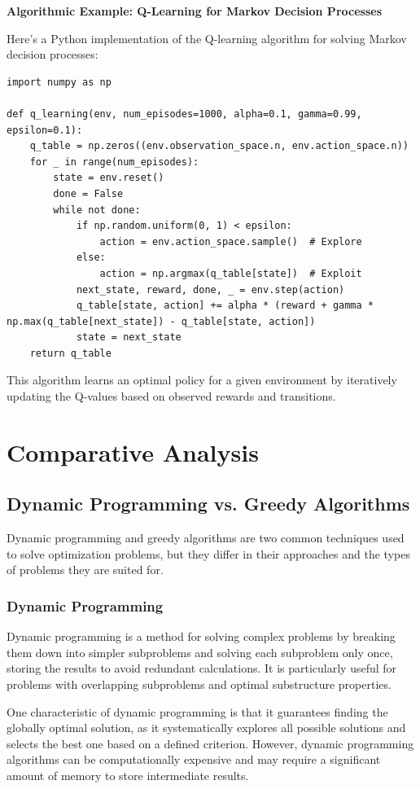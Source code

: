 \documentclass[12pt]{book} %
\begin{document}
\textbf{Algorithmic Example: Q-Learning for Markov Decision Processes}

Here's a Python implementation of the Q-learning algorithm for solving Markov decision processes:
\FloatBarrier
\begin{lstlisting}
import numpy as np

def q_learning(env, num_episodes=1000, alpha=0.1, gamma=0.99, epsilon=0.1):
    q_table = np.zeros((env.observation_space.n, env.action_space.n))
    for _ in range(num_episodes):
        state = env.reset()
        done = False
        while not done:
            if np.random.uniform(0, 1) < epsilon:
                action = env.action_space.sample()  # Explore
            else:
                action = np.argmax(q_table[state])  # Exploit
            next_state, reward, done, _ = env.step(action)
            q_table[state, action] += alpha * (reward + gamma * np.max(q_table[next_state]) - q_table[state, action])
            state = next_state
    return q_table
\end{lstlisting}
\FloatBarrier
This algorithm learns an optimal policy for a given environment by iteratively updating the Q-values based on observed rewards and transitions.


\section{Comparative Analysis}

\subsection{Dynamic Programming vs. Greedy Algorithms}

Dynamic programming and greedy algorithms are two common techniques used to solve optimization problems, but they differ in their approaches and the types of problems they are suited for.

\subsubsection{Dynamic Programming}

Dynamic programming is a method for solving complex problems by breaking them down into simpler subproblems and solving each subproblem only once, storing the results to avoid redundant calculations. It is particularly useful for problems with overlapping subproblems and optimal substructure properties.

One characteristic of dynamic programming is that it guarantees finding the globally optimal solution, as it systematically explores all possible solutions and selects the best one based on a defined criterion. However, dynamic programming algorithms can be computationally expensive and may require a significant amount of memory to store intermediate results.
\end{document}

